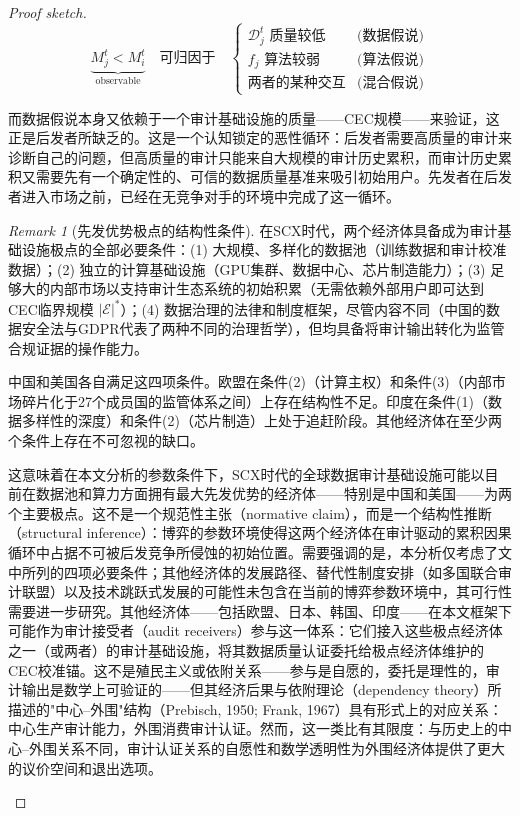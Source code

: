 \documentclass[12pt,a4paper]{ctexart}
\theoremstyle{definition}
\theoremstyle{remark}
\newtheorem{remark}{Remark}[section]
\begin{document}
\begin{proof}[Proof sketch]
\begin{equation}
\underbrace{M_j^t < M_i^t}_{\text{observable}} \quad \text{可归因于} \quad \begin{cases}
\mathcal{D}_j^t \text{ 质量较低} &\text{(数据假说)}\\
f_j \text{ 算法较弱} &\text{(算法假说)}\\
\text{两者的某种交互} &\text{(混合假说)}
\end{cases}
\end{equation}

而数据假说本身又依赖于一个审计基础设施的质量——CEC规模——来验证，这正是后发者所缺乏的。这是一个认知锁定的恶性循环：后发者需要高质量的审计来诊断自己的问题，但高质量的审计只能来自大规模的审计历史累积，而审计历史累积又需要先有一个确定性的、可信的数据质量基准来吸引初始用户。先发者在后发者进入市场之前，已经在无竞争对手的环境中完成了这一循环。

\begin{remark}[先发优势极点的结构性条件]
在SCX时代，两个经济体具备成为审计基础设施极点的全部必要条件：(1) 大规模、多样化的数据池（训练数据和审计校准数据）；(2) 独立的计算基础设施（GPU集群、数据中心、芯片制造能力）；(3) 足够大的内部市场以支持审计生态系统的初始积累（无需依赖外部用户即可达到CEC临界规模 $|\mathcal{E}|^*$）；(4) 数据治理的法律和制度框架，尽管内容不同（中国的数据安全法与GDPR代表了两种不同的治理哲学），但均具备将审计输出转化为监管合规证据的操作能力。

中国和美国各自满足这四项条件。欧盟在条件(2)（计算主权）和条件(3)（内部市场碎片化于27个成员国的监管体系之间）上存在结构性不足。印度在条件(1)（数据多样性的深度）和条件(2)（芯片制造）上处于追赶阶段。其他经济体在至少两个条件上存在不可忽视的缺口。

这意味着在本文分析的参数条件下，SCX时代的全球数据审计基础设施可能以目前在数据池和算力方面拥有最大先发优势的经济体——特别是中国和美国——为两个主要极点。这不是一个规范性主张（normative claim），而是一个结构性推断（structural inference）：博弈的参数环境使得这两个经济体在审计驱动的累积因果循环中占据不可被后发竞争所侵蚀的初始位置。需要强调的是，本分析仅考虑了文中所列的四项必要条件；其他经济体的发展路径、替代性制度安排（如多国联合审计联盟）以及技术跳跃式发展的可能性未包含在当前的博弈参数环境中，其可行性需要进一步研究。其他经济体——包括欧盟、日本、韩国、印度——在本文框架下可能作为审计接受者（audit receivers）参与这一体系：它们接入这些极点经济体之一（或两者）的审计基础设施，将其数据质量认证委托给极点经济体维护的CEC校准锚。这不是殖民主义或依附关系——参与是自愿的，委托是理性的，审计输出是数学上可验证的——但其经济后果与依附理论（dependency theory）所描述的"中心–外围"结构（Prebisch, 1950; Frank, 1967）具有形式上的对应关系：中心生产审计能力，外围消费审计认证。然而，这一类比有其限度：与历史上的中心–外围关系不同，审计认证关系的自愿性和数学透明性为外围经济体提供了更大的议价空间和退出选项。


\end{remark}
\end{proof}
\end{document}
